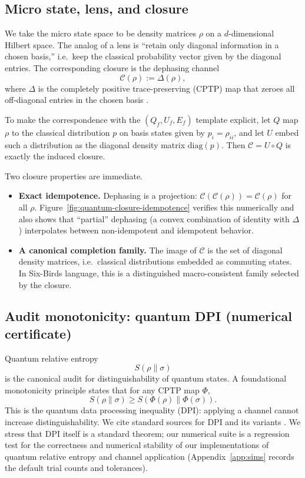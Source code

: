 \documentclass[11pt]{article}
\providecommand{\Qf}{Q_f}
\providecommand{\Uf}{U_f}
\begin{document}
\subsection{Micro state, lens, and closure}
We take the micro state space to be density matrices $\rho$ on a $d$-dimensional Hilbert space. The analog of a lens is ``retain only diagonal information in a chosen basis,'' i.e.\ keep the classical probability vector given by the diagonal entries. The corresponding closure is the dephasing channel
\[
  \mathcal{C}(\rho) := \Delta(\rho),
\]
where $\Delta$ is the completely positive trace-preserving (CPTP) map that zeroes all off-diagonal entries in the chosen basis \citep{nielsenchuang2010,zurek2003,schlosshauer2007}.

To make the correspondence with the $(\Qf,\Uf,E_f)$ template explicit, let $Q$ map $\rho$ to the classical distribution $p$ on basis states given by $p_i=\rho_{ii}$, and let $U$ embed such a distribution as the diagonal density matrix $\mathrm{diag}(p)$. Then $\mathcal{C}=U\circ Q$ is exactly the induced closure.

Two closure properties are immediate.
\begin{itemize}
  \item \textbf{Exact idempotence.} Dephasing is a projection: $\mathcal{C}(\mathcal{C}(\rho))=\mathcal{C}(\rho)$ for all $\rho$. Figure~\ref{fig:quantum-closure-idempotence} verifies this numerically and also shows that ``partial'' dephasing (a convex combination of identity with $\Delta$) interpolates between non-idempotent and idempotent behavior.

  \item \textbf{A canonical completion family.} The image of $\mathcal{C}$ is the set of diagonal density matrices, i.e.\ classical distributions embedded as commuting states. In Six-Birds language, this is a distinguished macro-consistent family selected by the closure.
\end{itemize}

\subsection{Audit monotonicity: quantum DPI (numerical certificate)}
Quantum relative entropy
\[
  S(\rho\|\sigma)
\]
is the canonical audit for distinguishability of quantum states. A foundational monotonicity principle states that for any CPTP map $\Phi$,
\[
  S(\rho\|\sigma) \ge S(\Phi(\rho)\|\Phi(\sigma)).
\]
This is the quantum data processing inequality (DPI): applying a channel cannot increase distinguishability.
We cite standard sources for DPI and its variants \citep{lindblad1975,petz1986,wilde2017}.
We stress that DPI itself is a standard theorem; our numerical suite is a regression test for the correctness and numerical stability of our implementations of quantum relative entropy and channel application (Appendix~\ref{app:sims} records the default trial counts and tolerances).
\end{document}

